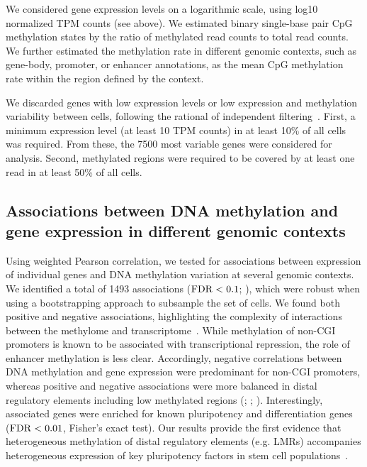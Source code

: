 We considered gene expression levels on a logarithmic scale, using log10 normalized TPM counts (see above). We estimated binary single-base pair CpG methylation states by the ratio of methylated read counts to total read counts. We further estimated the methylation rate in different genomic contexts, such as gene-body, promoter, or enhancer annotations, as the mean CpG methylation rate within the region defined by the context.

We discarded genes with low expression levels or low expression and methylation variability between cells, following the rational of independent filtering~\citep{bourgon_independent_2010}. First, a minimum expression level (at least 10 TPM counts) in at least 10\% of all cells was required. From these, the 7500 most variable genes were considered for analysis. Second, methylated regions were required to be covered by at least one read in at least 50\% of all cells.


\subsection{Associations between DNA methylation and gene expression in different genomic contexts} \label{sec:mt_results}

Using weighted Pearson correlation, we tested for associations between expression of individual genes and DNA methylation variation at several genomic contexts. We identified a total of 1493 associations ($\operatorname{FDR}<0.1$; ), which were robust when using a bootstrapping approach to subsample the set of cells. We found both positive and negative associations, highlighting the complexity of interactions between the methylome and transcriptome~\citep{dey_integrated_2015}. While methylation of non-CGI promoters is known to be associated with transcriptional repression, the role of enhancer methylation is less clear. Accordingly, negative correlations between DNA methylation and gene expression were predominant for non-CGI promoters, whereas positive and negative associations were more balanced in distal regulatory elements including low methylated regions (; ; ). Interestingly, associated genes were enriched for known pluripotency and differentiation genes~\citep{kolodziejczyk_single_2015} ($\operatorname{FDR}<0.01$, Fisher's exact test).  Our results provide the first evidence that heterogeneous methylation of distal regulatory elements (e.g. LMRs) accompanies heterogeneous expression of key pluripotency factors in stem cell populations~\citep{lee_reprogramming_2014}.

